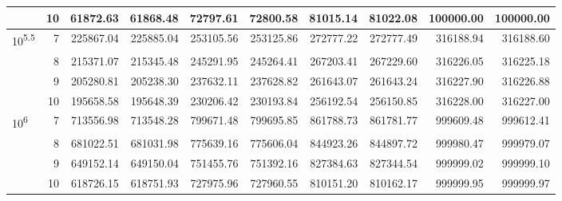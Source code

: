 \begin{table}[!ht]
\begin{adjustwidth}{-2.25in}{0in}
{\begin{tabular}{|l|r|r|r|r|r|r|r|r|r|}
   & 10 & 61872.63 & 61868.48 & 72797.61 & 72800.58 & 81015.14 & 81022.08 & 100000.00 & 100000.00 \\ \hline
  10\textsuperscript{5.5} & 7 & 225867.04 & 225885.04 & 253105.56 & 253125.86 & 272777.22 & 272777.49 & 316188.94 & 316188.60 \\ \cline{2-10}
   & 8 & 215371.07 & 215345.48 & 245291.95 & 245264.41 & 267203.41 & 267229.60 & 316226.05 & 316225.18 \\ \cline{2-10}
   & 9 & 205280.81 & 205238.30 & 237632.11 & 237628.82 & 261643.07 & 261643.24 & 316227.90 & 316226.88 \\ \cline{2-10}
   & 10 & 195658.58 & 195648.39 & 230206.42 & 230193.84 & 256192.54 & 256150.85 & 316228.00 & 316227.00 \\ \hline
  10\textsuperscript{6} & 7 & 713556.98 & 713548.28 & 799671.48 & 799695.85 & 861788.73 & 861781.77 & 999609.48 & 999612.41 \\ \cline{2-10}
   & 8 & 681022.51 & 681031.98 & 775639.16 & 775606.04 & 844923.26 & 844897.72 & 999980.47 & 999979.07 \\ \cline{2-10}
   & 9 & 649152.14 & 649150.04 & 751455.76 & 751392.16 & 827384.63 & 827344.54 & 999999.02 & 999999.10 \\ \cline{2-10}
   & 10 & 618726.15 & 618751.93 & 727975.96 & 727960.55 & 810151.20 & 810162.17 & 999999.95 & 999999.97 \\ 
   \hline
\end{tabular}}
\begin{flushleft}
\end{flushleft}
\end{adjustwidth}
\end{table}